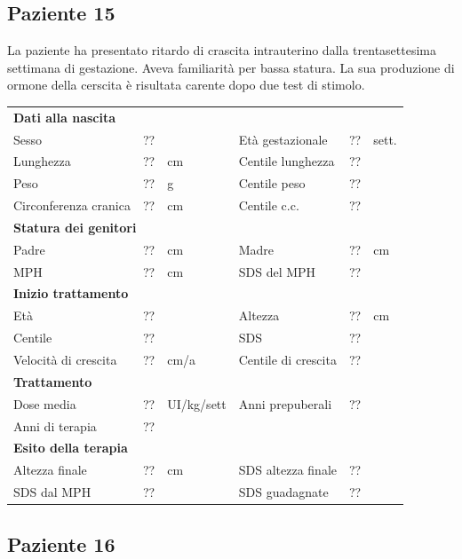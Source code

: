 \subsection*{Paziente 15}%

La paziente ha presentato ritardo di crascita intrauterino dalla trentasettesima settimana di gestazione. Aveva familiarità per bassa statura. La sua produzione di ormone della cerscita è risultata carente dopo due test di stimolo.

\begin{table}[!h]
\begin{tabular}{lrllrl}
\toprule
\multicolumn{6}{l}{\textbf{Dati alla nascita}}\\
Sesso 		& \multicolumn{2}{l}{??} 	& Età gestazionale 		& ?? 		& sett.\\
Lunghezza 	& ?? 		& cm 				& Centile lunghezza		& ?? 		\\
Peso 		& ?? 		& g					& Centile peso			& ?? 		\\
Circonferenza cranica	& ?? 		& cm 	& Centile c.c.			& ?? \\
\midrule
\multicolumn{6}{l}{\textbf{Statura dei genitori}}\\
Padre 		& ?? & cm 	& Madre 				& ?? & cm \\
MPH 		& ?? & cm 	& SDS del MPH 			& ??\\
\midrule
\multicolumn{6}{l}{\textbf{Inizio trattamento}} \\
Età	& ?? & 		& Altezza 				& ?? & cm  \\
Centile & ?? 	 &		& SDS		& ?? \\
Velocità di crescita & ?? & cm/a	& Centile di crescita & ??\\
\midrule
\multicolumn{6}{l}{\textbf{Trattamento}} \\
Dose media		& ?? & UI/kg/sett & Anni prepuberali & ??\\
Anni di terapia & ??\\
\midrule
\multicolumn{6}{l}{\textbf{Esito della terapia}} \\
Altezza finale			& ?? & cm 	& SDS altezza finale		& ??\\
SDS dal MPH				& ?? &		& SDS guadagnate 			& ??\\
\bottomrule
\end{tabular}
\end{table}
\clearpage


\subsection*{Paziente 16}%

